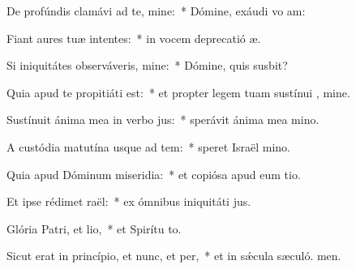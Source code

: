 \item De profúndis clamávi ad te, mine:~* Dómine, exáudi vo am:
\item Fiant aures tuæ intentes:~* in vocem deprecatió æ.
\item Si iniquitátes observáveris, mine:~* Dómine, quis susbit?
\item Quia apud te propitiáti est:~* et propter legem tuam sustínui , mine.
\item Sustínuit ánima mea in verbo jus:~* sperávit ánima mea  mino.
\item A custódia matutína usque ad tem:~* speret Israël  mino.
\item Quia apud Dóminum miseridia:~* et copiósa apud eum tio.
\item Et ipse rédimet raël:~* ex ómnibus iniquitáti jus.
\item Glória Patri, et lio,~* et Spirítu to.
\item Sicut erat in princípio, et nunc, et per,~* et in sǽcula sæculó. men.
